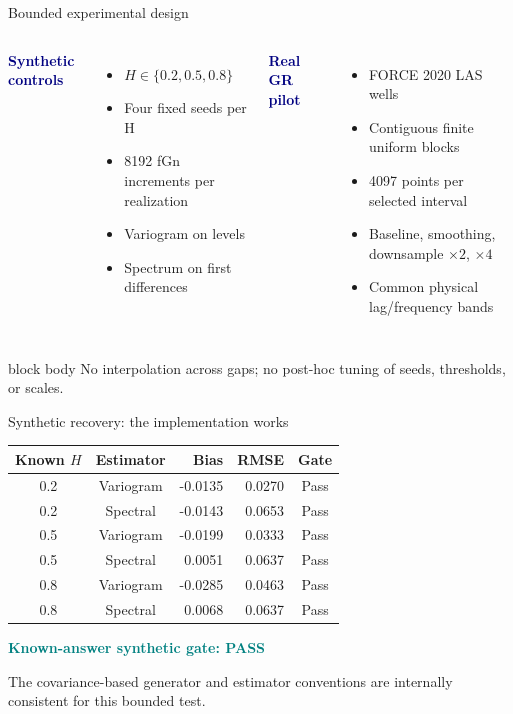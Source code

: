 \documentclass[aspectratio=169,11pt]{beamer}
\begin{document}
\begin{frame}{Bounded experimental design}
\begin{columns}[T,onlytextwidth]
\textcolor{Navy}{\Large\bfseries Synthetic controls}
\begin{itemize}
  \item $H\in\{0.2,0.5,0.8\}$
  \item Four fixed seeds per H
  \item 8192 fGn increments per realization
  \item Variogram on levels
  \item Spectrum on first differences
\end{itemize}
\textcolor{Navy}{\Large\bfseries Real GR pilot}
\begin{itemize}
  \item FORCE 2020 LAS wells
  \item Contiguous finite uniform blocks
  \item 4097 points per selected interval
  \item Baseline, smoothing, downsample $\times2$, $\times4$
  \item Common physical lag/frequency bands
\end{itemize}
\end{columns}
\vfill
\begin{beamercolorbox}[sep=0.22cm,wd=\textwidth]{block body}
\centering\small No interpolation across gaps; no post-hoc tuning of seeds, thresholds, or scales.
\end{beamercolorbox}
\end{frame}

\begin{frame}{Synthetic recovery: the implementation works}
\begin{table}
\centering\small
\begin{tabular}{@{}ccrrc@{}}
\toprule
Known $H$ & Estimator & Bias & RMSE & Gate\\
\midrule
0.2 & Variogram & -0.0135 & 0.0270 & Pass\\
0.2 & Spectral & -0.0143 & 0.0653 & Pass\\
0.5 & Variogram & -0.0199 & 0.0333 & Pass\\
0.5 & Spectral &  0.0051 & 0.0637 & Pass\\
0.8 & Variogram & -0.0285 & 0.0463 & Pass\\
0.8 & Spectral &  0.0068 & 0.0637 & Pass\\
\bottomrule
\end{tabular}
\end{table}
\vspace{0.2cm}
\begin{center}
\textcolor{Teal}{\Large\bfseries Known-answer synthetic gate: PASS}\par
\small The covariance-based generator and estimator conventions are internally consistent for this bounded test.
\end{center}
\end{frame}
\end{document}
